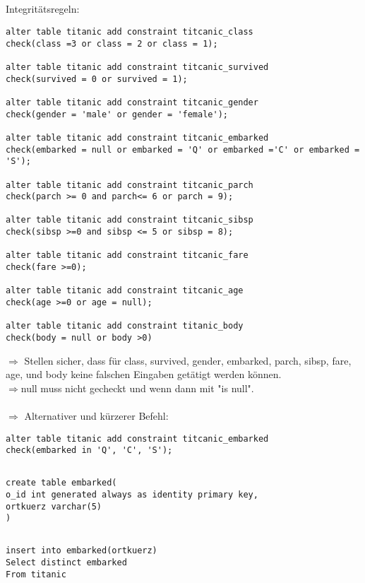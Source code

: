 \documentclass[a4paper,11pt,titlepage]{article}
\begin{document}
\subsection{}
Integritätsregeln:
\begin{verbatim}
alter table titanic add constraint titcanic_class 
check(class =3 or class = 2 or class = 1); 

alter table titanic add constraint titcanic_survived 
check(survived = 0 or survived = 1); 

alter table titanic add constraint titcanic_gender 
check(gender = 'male' or gender = 'female'); 

alter table titanic add constraint titcanic_embarked 
check(embarked = null or embarked = 'Q' or embarked ='C' or embarked = 'S');

alter table titanic add constraint titcanic_parch 
check(parch >= 0 and parch<= 6 or parch = 9);

alter table titanic add constraint titcanic_sibsp 
check(sibsp >=0 and sibsp <= 5 or sibsp = 8);

alter table titanic add constraint titcanic_fare 
check(fare >=0); 

alter table titanic add constraint titcanic_age
check(age >=0 or age = null); 

alter table titanic add constraint titanic_body 
check(body = null or body >0)
\end{verbatim}
$\Rightarrow$ Stellen sicher, dass für class, survived, gender, embarked, parch, sibsp, fare, age, und body keine falschen Eingaben getätigt werden können. \\
$\Rightarrow$null muss nicht gecheckt und wenn dann mit "is null".\\
\\
$\Rightarrow$ Alternativer und kürzerer Befehl:
\begin{verbatim}
alter table titanic add constraint titcanic_embarked 
check(embarked in 'Q', 'C', 'S');
\end{verbatim}
\subsection{}
\begin{verbatim}
create table embarked(
o_id int generated always as identity primary key,
ortkuerz varchar(5)
)
\end{verbatim}
\subsection{}
\begin{verbatim}
insert into embarked(ortkuerz)
Select distinct embarked
From titanic
\end{verbatim}
\end{document}
